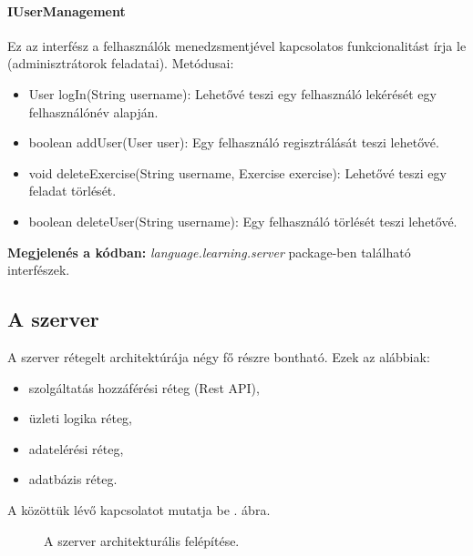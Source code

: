 \documentclass[11pt, a4paper]{article}
\begin{document}
    \paragraph{IUserManagement} Ez az interfész a felhasználók menedzsmentjével kapcsolatos funkcionalitást írja le (adminisztrátorok feladatai). Metódusai:
    \begin{itemize}
   	\item User logIn(String username): Lehetővé teszi egy felhasználó lekérését egy felhasználónév alapján.
   	
   	\item boolean addUser(User user): Egy felhasználó regisztrálását teszi lehetővé.
   	
   	\item void deleteExercise(String username, Exercise exercise): Lehetővé teszi egy feladat törlését.
   	
   	\item boolean deleteUser(String username): Egy felhasználó törlését teszi lehetővé.
   \end{itemize} 
   
    
    \textbf{Megjelenés a kódban:} \textit{language.learning.server} package-ben található interfészek.
    
    \subsection{A szerver}
    A szerver rétegelt architektúrája négy fő részre bontható. Ezek az alábbiak:
    \begin{itemize}
    	\item szolgáltatás hozzáférési réteg (Rest API),
    	\item üzleti logika réteg,
    	\item adatelérési réteg,
    	\item adatbázis réteg.
    \end{itemize}
    A közöttük lévő kapcsolatot mutatja be . ábra.
    
    \begin{figure}[htbp]
    	\center
    	\caption{A szerver architekturális felépítése.}
    	\label{fig:server_arch}
    \end{figure}
    
\end{document}
